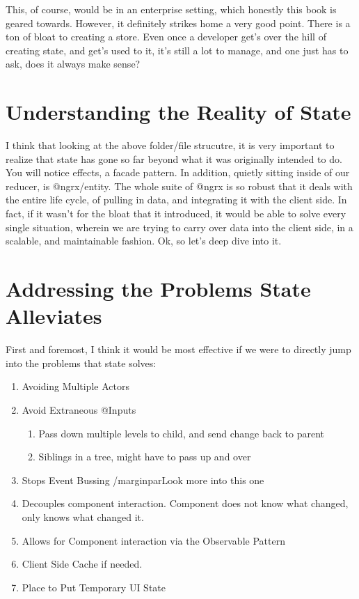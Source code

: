 This, of course, would be in an enterprise setting, which honestly this book
is geared towards. However, it definitely strikes home a very good point. There
is a ton of bloat to creating a store. Even once a developer get's over the hill
of creating state, and get's used to it, it's still a lot to manage, and one
just has to ask, does it always make sense?

\section{Understanding the Reality of State}
I think that looking at the above folder/file strucutre, it is very important
to realize that state has gone so far beyond what it was originally intended to
do. You will notice effects, a facade pattern. In addition, quietly sitting
inside of our reducer, is @ngrx/entity. The whole suite of @ngrx is so robust
that it deals with the entire life cycle, of pulling in data, and integrating it
with the client side. In fact, if it wasn't for the bloat that it introduced,
it would be able to solve every single situation, wherein we are trying to carry
over data into the client side, in a scalable, and maintainable fashion. Ok, so
let's deep dive into it.

\section{ Addressing the Problems State Alleviates }
First and foremost, I think it would be most effective if we were to directly
jump into the problems that state solves:
\begin{enumerate}
  \item Avoiding Multiple Actors
  \item Avoid Extraneous @Inputs
  \begin{enumerate}
    \item Pass down multiple levels to child, and send change back to parent
    \item Siblings in a tree, might have to pass up and over
  \end{enumerate}
  \item Stops Event Bussing /marginpar{Look more into this one}
  \item Decouples component interaction. Component does not know what changed,
  only knows what changed it.
  \item Allows for Component interaction via the Observable Pattern
  \item Client Side Cache if needed.
  \item Place to Put Temporary UI State
\end{enumerate}

